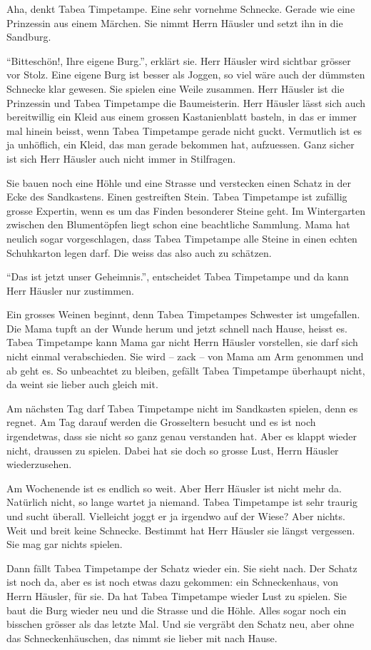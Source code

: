 Aha, denkt Tabea Timpetampe. Eine sehr vornehme Schnecke. Gerade wie eine Prinzessin aus einem Märchen. Sie nimmt Herrn Häusler und setzt ihn in die Sandburg.

\enquote{Bitteschön!, Ihre eigene Burg.}, erklärt sie. Herr Häusler wird sichtbar grösser vor Stolz. Eine eigene Burg ist besser als Joggen, so viel wäre auch der dümmsten Schnecke klar gewesen. Sie spielen eine Weile zusammen. Herr Häusler ist die Prinzessin und Tabea Timpetampe die Baumeisterin. Herr Häusler lässt sich auch bereitwillig ein Kleid aus einem grossen Kastanienblatt basteln, in das er immer mal hinein beisst, wenn Tabea Timpetampe gerade nicht guckt. Vermutlich ist es ja unhöflich, ein Kleid, das man gerade bekommen hat, aufzuessen. Ganz sicher ist sich Herr Häusler auch nicht immer in Stilfragen.

Sie bauen noch eine Höhle und eine Strasse und verstecken einen Schatz in der Ecke des Sandkastens. Einen gestreiften Stein. Tabea Timpetampe ist zufällig grosse Expertin, wenn es um das Finden besonderer Steine geht. Im Wintergarten zwischen den Blumentöpfen liegt schon eine beachtliche Sammlung. Mama hat neulich sogar vorgeschlagen, dass Tabea Timpetampe alle Steine in einen echten Schuhkarton legen darf. Die weiss das also auch zu schätzen.

\enquote{Das ist jetzt unser Geheimnis.}, entscheidet Tabea Timpetampe und da kann Herr Häusler nur zustimmen. 

Ein grosses Weinen beginnt, denn Tabea Timpetampes Schwester ist umgefallen. Die Mama tupft an der Wunde herum und jetzt schnell nach Hause, heisst es. Tabea Timpetampe kann Mama gar nicht Herrn Häusler vorstellen, sie darf sich nicht einmal verabschieden. Sie wird -- zack -- von Mama am Arm genommen und ab geht es. So unbeachtet zu bleiben, gefällt Tabea Timpetampe überhaupt nicht, da weint sie lieber auch gleich mit.

Am nächsten Tag darf Tabea Timpetampe nicht im Sandkasten spielen, denn es regnet. Am Tag darauf werden die Grosseltern besucht und es ist noch irgendetwas, dass sie nicht so ganz genau verstanden hat. Aber es klappt wieder nicht, draussen zu spielen. Dabei hat sie doch so grosse Lust, Herrn Häusler wiederzusehen. 

Am Wochenende ist es endlich so weit. Aber Herr Häusler ist nicht mehr da. Natürlich nicht, so lange wartet ja niemand. Tabea Timpetampe ist sehr traurig und sucht überall. Vielleicht joggt er ja irgendwo auf der Wiese? Aber nichts. Weit und breit keine Schnecke. Bestimmt hat Herr Häusler sie längst vergessen. Sie mag gar nichts spielen.

Dann fällt Tabea Timpetampe der Schatz wieder ein. Sie sieht nach. Der Schatz ist noch da, aber es ist noch etwas dazu gekommen: ein Schneckenhaus, von Herrn Häusler, für sie. Da hat Tabea Timpetampe wieder Lust zu spielen. Sie baut die Burg wieder neu und die Strasse und die Höhle. Alles sogar noch ein bisschen grösser als das letzte Mal. Und sie vergräbt den Schatz neu, aber ohne das Schneckenhäuschen, das nimmt sie lieber mit nach Hause. \hfill {\color{DeepPink}\decofourleft}
